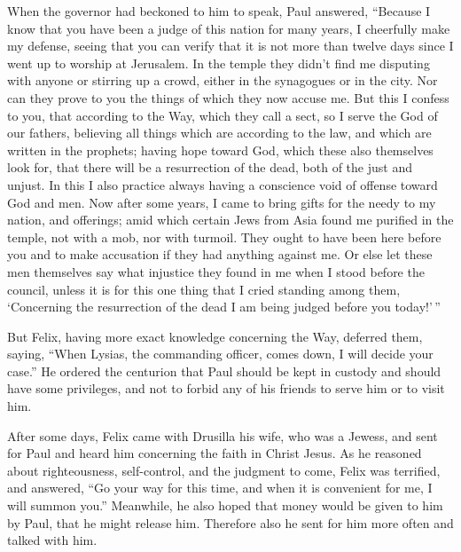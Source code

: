  When the governor had beckoned to him to speak, Paul
answered, ``Because I know that you have been a judge of this nation for
many years, I cheerfully make my defense,  seeing that
you can verify that it is not more than twelve days since I went up to
worship at Jerusalem.  In the temple they didn't find me
disputing with anyone or stirring up a crowd, either in the synagogues
or in the city.  Nor can they prove to you the things of
which they now accuse me.  But this I confess to you,
that according to the Way, which they call a sect, so I serve the God of
our fathers, believing all things which are according to the law, and
which are written in the prophets;  having hope toward
God, which these also themselves look for, that there will be a
resurrection of the dead, both of the just and unjust. 
In this I also practice always having a conscience void of offense
toward God and men.  Now after some years, I came to
bring gifts for the needy to my nation, and offerings; 
amid which certain Jews from Asia found me purified in the temple, not
with a mob, nor with turmoil.  They ought to have been
here before you and to make accusation if they had anything against me.
 Or else let these men themselves say what injustice they
found in me when I stood before the council,  unless it
is for this one thing that I cried standing among them, `Concerning the
resurrection of the dead I am being judged before you today!'\,''

 But Felix, having more exact knowledge concerning the
Way, deferred them, saying, ``When Lysias, the commanding officer, comes
down, I will decide your case.''  He ordered the
centurion that Paul should be kept in custody and should have some
privileges, and not to forbid any of his friends to serve him or to
visit him.

 After some days, Felix came with Drusilla his wife, who
was a Jewess, and sent for Paul and heard him concerning the faith in
Christ Jesus.  As he reasoned about righteousness,
self-control, and the judgment to come, Felix was terrified, and
answered, ``Go your way for this time, and when it is convenient for me,
I will summon you.''  Meanwhile, he also hoped that money
would be given to him by Paul, that he might release him. Therefore also
he sent for him more often and talked with him.

